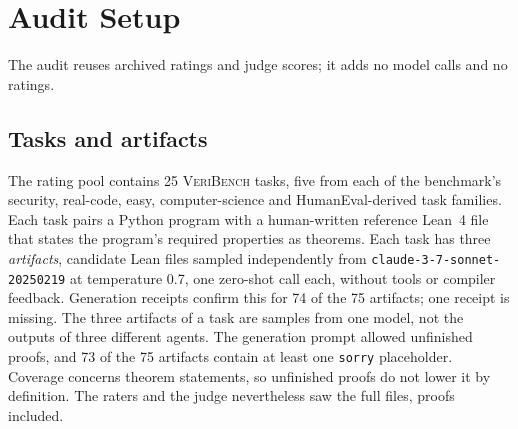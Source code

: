 \section{Audit Setup}
\label{sec:setup}
The audit reuses archived ratings and judge scores; it adds no model calls and no ratings.

\subsection{Tasks and artifacts}
The rating pool contains 25 \textsc{VeriBench} tasks, five from each of the benchmark's security, real-code, easy, computer-science and HumanEval-derived task families.
Each task pairs a Python program with a human-written reference Lean~4 file~\citep{moura2021lean} that states the program's required properties as theorems.
Each task has three \emph{artifacts}, candidate Lean files sampled independently from \texttt{claude-3-7-sonnet-20250219} at temperature 0.7, one zero-shot call each, without tools or compiler feedback.
Generation receipts confirm this for 74 of the 75 artifacts; one receipt is missing.
The three artifacts of a task are samples from one model, not the outputs of three different agents.
The generation prompt allowed unfinished proofs, and 73 of the 75 artifacts contain at least one \texttt{sorry} placeholder.
Coverage concerns theorem statements, so unfinished proofs do not lower it by definition.
The raters and the judge nevertheless saw the full files, proofs included.


